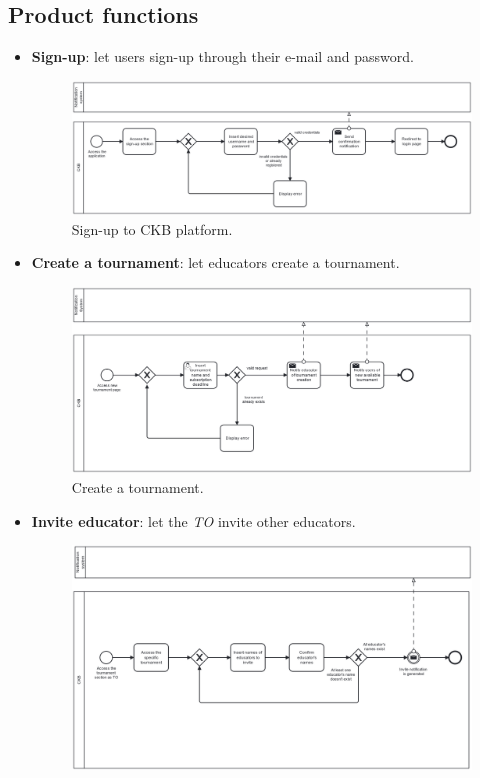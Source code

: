 \documentclass[../RASD.tex]{subfiles}
\begin{document}
    \subsection{Product functions}\label{subsec:product_functions}
    \begin{itemize}
        \item {\textbf{Sign-up}: let users sign-up through their e-mail and password.
        \begin{figure}[h]
            \centering
            \includegraphics[width=\textwidth]{../assets/section_2/sign_up_definitive.png}
            \caption{Sign-up to CKB platform.}
            \label{img:bpmn_login}
        \end{figure}
        \newpage
        }
        \item {\textbf{Create a tournament}: let educators create a tournament.
        \begin{figure}[h]
            \centering
            \includegraphics[width=\textwidth]{../assets/section_2/create_tournament_definitive.png}
            \caption{Create a tournament.}
            \label{img:bpmn_create_tournament}
        \end{figure}
        \newpage
        }
        \item {\textbf{Invite educator}: let the \textit{TO} invite other educators.
        \begin{figure}[h]
            \centering
            \includegraphics[width=\textwidth]{../assets/section_2/InviteEducator_definitive.png}

\end{figure}}
\end{itemize}
\end{document}
